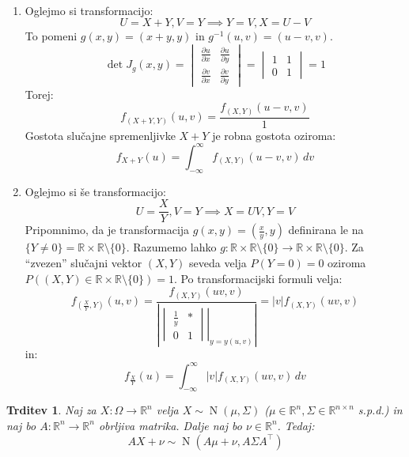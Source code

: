 \documentclass[12pt]{book}
\theoremstyle{definition}
\theoremstyle{plain}
\theoremstyle{plain}
\newtheorem{trditev}{Trditev}
\theoremstyle{plain}
\theoremstyle{remark}
\begin{document}
\begin{zgled}
    ~

    \begin{enumerate}
        \item Oglejmo si transformacijo: 
        $$
        U=X+Y, V=Y \implies Y=V, X=U-V
        $$
        To pomeni $g(x, y)=(x+y, y)$ in $g^{-1}(u, v)=(u-v, v)$. 
        $$
        \det J_g (x,y) = \begin{vmatrix}
            \frac{\partial u}{\partial x} & \frac{\partial u}{\partial y} \\
            \frac{\partial v}{\partial x} & \frac{\partial v}{\partial y}
            \end{vmatrix} = \begin{vmatrix}1 & 1 \\ 0 & 1\end{vmatrix} = 1
        $$
        Torej: 
        $$
        f_{(X+Y, Y)}(u, v)=\frac{f_{(X, Y)}(u-v, v)}{1}
        $$
        Gostota slučajne spremenljivke $X+Y$ je robna gostota oziroma: 
        $$
        f_{X+Y}(u)=\int_{-\infty}^{\infty} f_{(X, Y)}(u-v, v) \, d v
        $$
        \item Oglejmo si še transformacijo: 
        $$
        U=\frac{X}{Y}, V=Y \implies X=U V, Y=V
        $$  
        Pripomnimo, da je transformacija $g(x, y)=\left(\frac{x}{y}, y\right)$ definirana le na $\{Y \neq 0\}=\mathbb{R} \times \mathbb{R} \setminus \{0\}$. Razumemo lahko $g: \mathbb{R} \times \mathbb{R} \setminus\{0\} \to \mathbb{R} \times \mathbb{R} \setminus\{0\}$. Za “zvezen” slučajni vektor $(X,Y)$ seveda velja $P(Y=0)=0$ oziroma $P((X, Y) \in \mathbb{R} \times \mathbb{R} \setminus\{0\})=1$. Po transformacijski formuli velja: 
        $$
        f_{\left(\frac{X}{Y}, Y\right)}(u, v) = \frac{f_{(X, Y)}(u v, v)}{\left\lvert\left.\begin{vmatrix}\frac{1}{y} & * \\ 0 & 1\end{vmatrix}\right|_{y = y(u,v)}\right\rvert} =|v| f_{(X, Y)}(u v, v)
        $$  
        in:
        $$
        f_{\frac{X}{Y}}(u)=\int_{-\infty}^{\infty}|v| f_{(X, Y)}(u v, v) \, d v
        $$
    \end{enumerate}
\end{zgled}

\begin{trditev}
    Naj za $X: \Omega \rightarrow \mathbb{R}^n$ velja $X \sim \operatorname{N}(\mu, \Sigma)$ ($\mu \in \mathbb{R}^n, \Sigma \in \mathbb{R}^{n \times n}$ s.p.d.) in naj bo $A: \mathbb{R}^n \to \mathbb{R}^n$ obrljiva matrika. Dalje naj bo $\nu \in \mathbb{R}^n$. Tedaj: 
    $$
    A X+\nu \sim \operatorname{N}\left(A \mu+\nu, A \Sigma A^{\top}\right)
    $$
\end{trditev}
\end{document}
